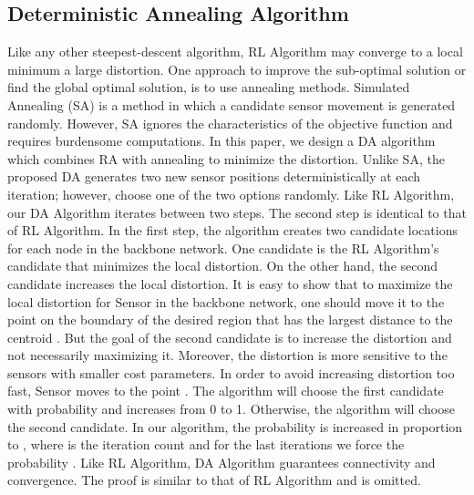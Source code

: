 \documentclass[journal,draftcls,onecolumn,12pt,twoside, narroweqnarray]{IEEEtran}
\begin{document}
\subsection{Deterministic Annealing Algorithm}
Like any other steepest-descent algorithm, RL Algorithm may converge to a local minimum a large distortion. One approach to improve the sub-optimal solution or find the global optimal solution, is to use annealing methods. Simulated Annealing (SA) \cite{SA,SR} is a method in which a candidate sensor movement is generated randomly. However, SA ignores the characteristics of the objective function and requires burdensome computations. In this paper, we design a DA algorithm which combines RA with annealing to minimize the distortion. Unlike SA, the proposed DA generates two new sensor positions deterministically at each iteration; however, choose one of the two options randomly.
Like RL Algorithm, our DA Algorithm iterates between two steps. The second step is identical to that of RL Algorithm. In the first step, the algorithm creates two candidate locations for each node in the backbone network. One candidate is the RL Algorithm's candidate that minimizes the local distortion. On the other hand, the second candidate increases the local distortion. It is easy to show that to maximize the local distortion for Sensor  in the backbone network, one should move it to the point  on the boundary of the desired region  that has the largest distance to the centroid . But the goal of the second candidate is to increase the distortion and not necessarily maximizing it. Moreover, the distortion is more sensitive to the sensors with smaller cost parameters. In order to avoid increasing distortion too fast, Sensor  moves to the point . The algorithm will choose the first candidate with probability  and increases  from 0 to 1. Otherwise, the algorithm will choose the second candidate. In our algorithm, the probability  is increased in proportion to , where  is the iteration count and for the last  iterations we force the probability .
Like RL Algorithm, DA Algorithm guarantees connectivity and convergence. The proof is similar to that of RL Algorithm and is omitted.
\end{document}
